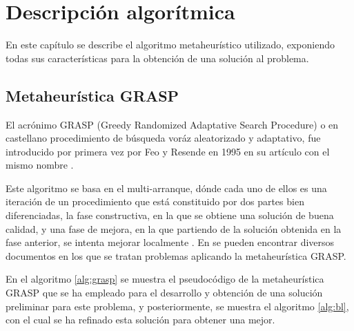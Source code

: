 
\chapter{Descripción algorítmica} %

\label{Chapter3}

En este capítulo se describe el algoritmo metaheurístico utilizado, exponiendo todas sus características para la obtención de una solución al problema.

\section{Metaheurística GRASP}
El acrónimo \gls{GRASP} (Greedy Randomized Adaptative Search Procedure) o en castellano procedimiento de búsqueda voráz aleatorizado y adaptativo, fue introducido por primera vez por Feo y Resende en 1995 en su artículo con el mismo nombre \cite{grasp-feo-resende}.

Este algoritmo se basa en el multi-arranque, dónde cada uno de ellos es una iteración de un procedimiento que está constituido por dos partes bien diferenciadas, la fase constructiva, en la que se obtiene una solución de buena calidad, y una fase de mejora, en la que partiendo de la solución obtenida en la fase anterior, se intenta mejorar localmente \cite{libro-metaheuristicas}. 
En \cite{grasp-flightrecoveryproblem} \cite{grasp-parallel} \cite{grasp-weapon} \cite{grasp-empaquetado} \cite{grasp-ruta} \cite{grasp-vertex} se pueden encontrar diversos documentos en los que se tratan problemas aplicando la metaheurística \gls{GRASP}.

En el algoritmo \ref{alg:grasp} se muestra el pseudocódigo de la metaheurística \gls{GRASP} que se ha empleado para el desarrollo y obtención de una solución preliminar para este problema, y posteriormente, se muestra el algoritmo \ref{alg:bl}, con el cual se ha refinado esta solución para obtener una mejor.\\

